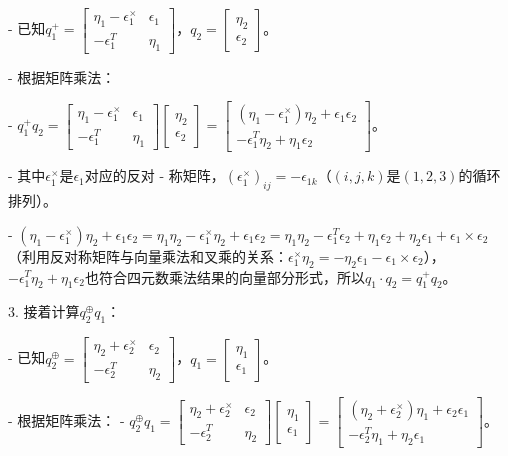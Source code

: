 \documentclass[12pt, a4paper, oneside]{ctexart}
\begin{document}
	- 已知\(q_1^{+}=\left[\begin{array}{cc}\eta_1 - \epsilon_1^{\times}&\epsilon_1\\-\epsilon_1^{T}&\eta_1\end{array}\right]\)，\(q_2=\left[\begin{array}{c}\eta_2\\\epsilon_2\end{array}\right]\)。

	- 根据矩阵乘法：

	- \(q_1^{+}q_2=\left[\begin{array}{cc}\eta_1 - \epsilon_1^{\times}&\epsilon_1\\-\epsilon_1^{T}&\eta_1\end{array}\right]\left[\begin{array}{c}\eta_2\\\epsilon_2\end{array}\right]=\left[\begin{array}{c}(\eta_1 - \epsilon_1^{\times})\eta_2+\epsilon_1\epsilon_2\\-\epsilon_1^{T}\eta_2+\eta_1\epsilon_2\end{array}\right]\)。

	- 其中\(\epsilon_1^{\times}\)是\(\epsilon_1\)对应的反对 - 称矩阵，\((\epsilon_1^{\times})_{ij}=-\epsilon_{1k}\)（\((i,j,k)\)是\((1,2,3)\)的循环排列）。

	- \((\eta_1 - \epsilon_1^{\times})\eta_2+\epsilon_1\epsilon_2=\eta_1\eta_2-\epsilon_1^{\times}\eta_2+\epsilon_1\epsilon_2=\eta_1\eta_2-\epsilon_1^{T}\epsilon_2+\eta_1\epsilon_2+\eta_2\epsilon_1+\epsilon_1\times\epsilon_2\)（利用反对称矩阵与向量乘法和叉乘的关系：\(\epsilon_1^{\times}\eta_2 =-\eta_2\epsilon_1-\epsilon_1\times\epsilon_2\)），\(-\epsilon_1^{T}\eta_2+\eta_1\epsilon_2\)也符合四元数乘法结果的向量部分形式，所以\(q_1\cdot q_2 = q_1^{+}q_2\)。
	
	3. 接着计算\(q_2^{\oplus}q_1\)：
	
	- 已知\(q_2^{\oplus}=\left[\begin{array}{cc}\eta_2+\epsilon_2^{\times}&\epsilon_2\\-\epsilon_2^{T}&\eta_2\end{array}\right]\)，\(q_1=\left[\begin{array}{c}\eta_1\\\epsilon_1\end{array}\right]\)。

	- 根据矩阵乘法：
	- \(q_2^{\oplus}q_1=\left[\begin{array}{cc}\eta_2+\epsilon_2^{\times}&\epsilon_2\\-\epsilon_2^{T}&\eta_2\end{array}\right]\left[\begin{array}{c}\eta_1\\\epsilon_1\end{array}\right]=\left[\begin{array}{c}(\eta_2+\epsilon_2^{\times})\eta_1+\epsilon_2\epsilon_1\\-\epsilon_2^{T}\eta_1+\eta_2\epsilon_1\end{array}\right]\)。
\end{document}
